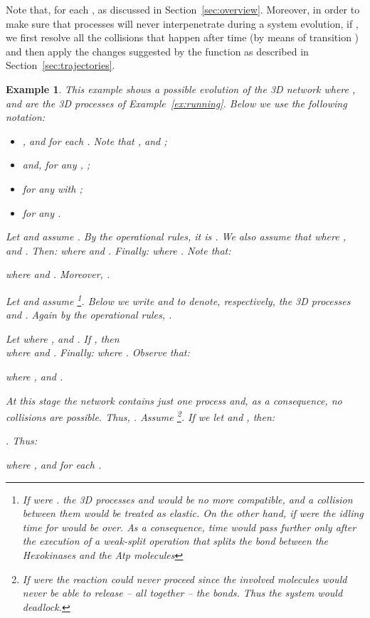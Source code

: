 \documentclass[11pt]{article}
\newtheorem{example}{Example}
\begin{document}
Note that, for each ,  as discussed in Section~\ref{sec:overview}. Moreover, in order to make sure that processes will never interpenetrate during a system evolution, if , we first resolve all the collisions that happen after time  (by means of transition ) and then apply the changes suggested by the function  as described in Section~\ref{sec:trajectories}.

\begin{example}\label{ex:evolution}
This example shows a possible evolution of the 3D network  where ,  and  are the 3D processes of Example~\ref{ex:running}. Below we use the following notation:

\begin{itemize}
\item [ - ]  ,  and  for each . Note that ,  and ;

\item [ - ]    and, for any ,  ;

\item [ - ]  for any  with ;

\item [ - ]   for any .
\end{itemize}


\noindent Let  and assume . By the operational rules, it is . We also assume that  where ,  and . Then:  where  and . Finally:  where . Note that:



\noindent where  and . Moreover, .

Let  and assume \footnote{If were . the 3D processes  and  would be no more compatible, and a collision between them would be treated as elastic. On the other hand, if were  the idling time for  would be over. As a consequence, time would pass further only after the execution of a weak-split operation that splits the bond between the Hexokinases and the Atp molecules}. Below we write  and  to denote, respectively, the 3D processes  and . Again by the operational rules, .

Let  where ,  and . If , then
\\  where  and .  Finally:  where . Observe that:





\noindent where ,  and .

At this stage the network contains just one process and, as a consequence, no collisions are possible. Thus, . Assume \footnote{If were  the reaction could never proceed since the involved molecules would never be able to release -- all together -- the bonds. Thus the system would deadlock.}. If we let  and , then:

\noindent . Thus:



where ,  and  for each .
\end{example}
\end{document}
